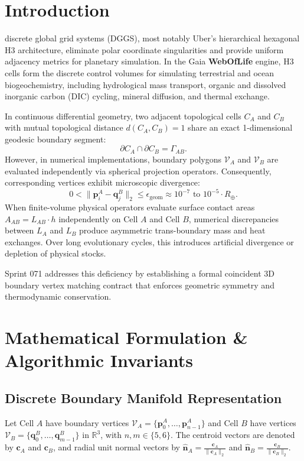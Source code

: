 \documentclass[10pt,journal,compsoc]{IEEEtran}
\begin{document}
\section{Introduction}
 discrete global grid systems (DGGS), most notably Uber's hierarchical hexagonal H3 architecture, eliminate polar coordinate singularities and provide uniform adjacency metrics for planetary simulation. In the Gaia \textbf{WebOfLife} engine, H3 cells form the discrete control volumes for simulating terrestrial and ocean biogeochemistry, including hydrological mass transport, organic and dissolved inorganic carbon (DIC) cycling, mineral diffusion, and thermal exchange.

In continuous differential geometry, two adjacent topological cells $C_A$ and $C_B$ with mutual topological distance $d(C_A, C_B) = 1$ share an exact 1-dimensional geodesic boundary segment:
\begin{equation}
\partial C_A \cap \partial C_B = \Gamma_{AB}.
\end{equation}
However, in numerical implementations, boundary polygons $\mathcal{V}_A$ and $\mathcal{V}_B$ are evaluated independently via spherical projection operators. Consequently, corresponding vertices exhibit microscopic divergence:
\begin{equation}
0 < \|\mathbf{p}_i^A - \mathbf{q}_j^B\|_2 \le \epsilon_{\text{geom}} \approx 10^{-7} \text{ to } 10^{-5} \cdot R_\oplus.
\end{equation}
When finite-volume physical operators evaluate surface contact areas $A_{AB} = L_{AB} \cdot h$ independently on Cell $A$ and Cell $B$, numerical discrepancies between $L_A$ and $L_B$ produce asymmetric trans-boundary mass and heat exchanges. Over long evolutionary cycles, this introduces artificial divergence or depletion of physical stocks.

Sprint 071 addresses this deficiency by establishing a formal coincident 3D boundary vertex matching contract that enforces geometric symmetry and thermodynamic conservation.

\section{Mathematical Formulation \& Algorithmic Invariants}

\subsection{Discrete Boundary Manifold Representation}
Let Cell $A$ have boundary vertices $\mathcal{V}_A = \{ \mathbf{p}_0^A, \dots, \mathbf{p}_{n-1}^A \}$ and Cell $B$ have vertices $\mathcal{V}_B = \{ \mathbf{q}_0^B, \dots, \mathbf{q}_{m-1}^B \}$ in $\mathbb{R}^3$, with $n, m \in \{5, 6\}$. The centroid vectors are denoted by $\mathbf{c}_A$ and $\mathbf{c}_B$, and radial unit normal vectors by $\hat{\mathbf{n}}_A = \frac{\mathbf{c}_A}{\|\mathbf{c}_A\|_2}$ and $\hat{\mathbf{n}}_B = \frac{\mathbf{c}_B}{\|\mathbf{c}_B\|_2}$.
\end{document}
